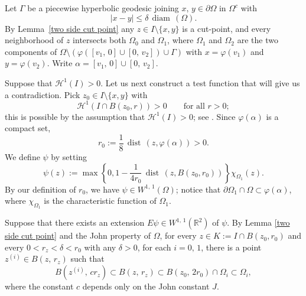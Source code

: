 \documentclass[reqno,11pt]{amsart}
\def\rr{{\mathbb R}}
\def\ch{{\mathcal H}}
\def\az{\alpha}
\def\dist{{\mathop\mathrm{\,dist\,}}}
\def\wz{\widetilde}
\def\diam{{\mathop\mathrm{\,diam\,}}}
\numberwithin{equation}{section}
\theoremstyle{remark}
\begin{document}
Let $\Gamma$ be a piecewise 
hyperbolic geodesic joining $x,\,y\in \partial \Omega$ in $\Omega^c$ with
$$|x-y|\le \delta \diam(\Omega).$$
By Lemma~\ref{two side cut point}  any $z \in I\setminus\{x,y\}$ is a cut-point, and every 
neighborhood of $z$ intersects both $\Omega_0$ and $\Omega_1$, where $\Omega_1$ and $\Omega_2$ are the two components of $\Omega\setminus(\varphi([v_1,\,0]\cup[0,\,v_2]) \cup \Gamma)$ with $x=\varphi(v_1)$ and $y=\varphi(v_2)$. Write $\az= [v_1,\,0]\cup[0,\,v_2]$.  



Suppose that $\ch^1(I)>0$. 
Let us next construct a test function that will give us a contradiction.
Pick $z_0 \in I \setminus\{x,y\}$ with 
\[
\ch^1(I\cap B(z_0,r))>0\qquad \text{for all }r>0;
\]
this is possible by the assumption that $\ch^1(I)>0$; see 
\cite[Theorem 2, Page 72]{EG1992}. Since $\varphi(\alpha)$ is a compact set, 
\[
 r_0 := \frac1 8\dist(z,\varphi(\az))>0.
\]
We define $\psi $ by setting
\[
 \psi(z) := \max\left\{0,1-\frac{1}{4 r_0}\dist(z,B(z_0,r_0))\right\}\chi_{\Omega_1}(z).
\]
By our definition of $r_0$, we have $\psi \in W^{1,\,1}(\Omega)$; notice that $\partial \Omega_1 \cap \Omega\subset \varphi(\az)$, where $\chi_{\Omega_1}$ is the characteristic function of $\Omega_1$. 


Suppose that there exists an extension $E\psi\in W^{1,\,1}(\rr^2)$ of $\psi$. By   Lemma \ref{two side cut point} and the John property of $\Omega$, for every $z \in K := I \cap B(z_0,r_0)$ and every $0 < r_z <\delta <r_0$ with any $\delta>0$, for each $i =0,\,1$, there is a point
$z^{(i)} \in B(z,\,r_z)$ such that 
$$B(z^{(i)},\,cr_z)\subset B(z,\,r_z) \subset B(z_0,\, 2r_0)\cap \Omega_i \subset \Omega_i, $$
where the constant $c$ depends only on the John constant $J$. 
\end{document}
